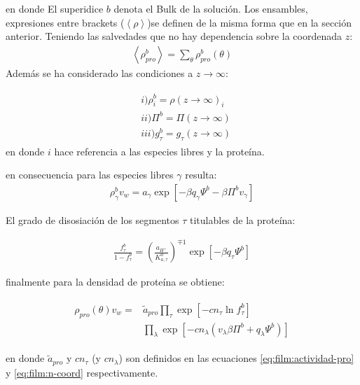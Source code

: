 \noindent en donde El superidice $b$ denota el Bulk de la soluci\'on. 
 Los ensambles, expresiones entre brackets ($\left<\rho\right>$)se definen de la misma forma que en la secci\'on anterior. Teniendo las salvedades que no hay dependencia sobre la coordenada $z$:
 \begin{align}
 	\left<\rho^b_{pro}\right> = \sum_{\theta}\rho^b_{pro}(\theta)
 \end{align}
 Adem\'as se ha considerado las condiciones a $z \to \infty$:

\begin{align}
	\begin{aligned}
		& i)\rho^b_i =\rho(z \rightarrow \infty)_i   \\
		& ii)  \Pi^b = \Pi(z \rightarrow \infty) \\
		& iii) g_\tau^b = g_\tau(z \rightarrow \infty)  
	\end{aligned}
\end{align}
\noindent en donde $i$ hace referencia a las especies libres y la prote\'ina. 

en consecuencia para las especies libres $\gamma$ resulta:
\begin{align}
	\rho^b_\gamma v_w = a_\gamma \exp\left[ -\beta q_\gamma \Psi^b -\beta \Pi^b v_\gamma \right]
	\label{eq:rhofree-bulk}
\end{align}

El grado de disosiaci\'on de los segmentos $\tau$ titulables de la prote\'ina:

\begin{align}
		\frac{f^b_\tau}{1-f^b_\tau} = \left(\frac{a_{H^+}}{K^0_{a,\tau}}\right)^{\mp 1} \exp[-\beta q_\tau \Psi^b]
\end{align}


finalmente para la densidad de prote\'ina se obtiene:

\begin{align}
	\begin{aligned}
		\rho_{pro}(\theta)v_w = &\tilde{a}_{pro} \prod_\tau \exp\left[-cn_\tau \ln f^b_\tau\right] \\
		& \prod_\lambda \exp \left[-cn_\lambda (v_\lambda\beta\Pi^b + q_\lambda \Psi^b) \right]
	\end{aligned}
	\label{eq:rhopro-bulk}
\end{align}

\noindent en donde $\tilde{a}_{pro}$ y $cn_\tau$ (y $cn_\lambda$) son definidos en las ecuaciones  \ref{eq:film:actividad-pro} y \ref{eq:film:n-coord} respectivamente. 

